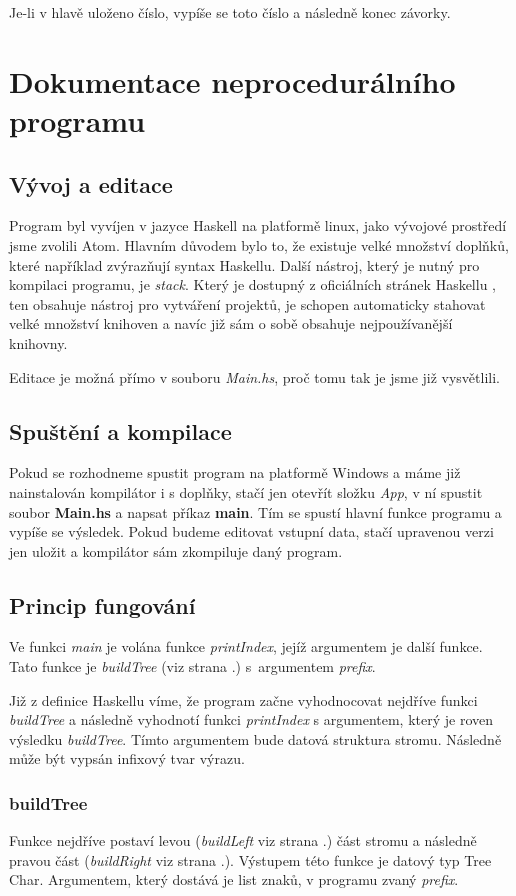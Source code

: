 \documentclass[12pt,a4paper]{report}
\begin{document}
Je-li v hlavě uloženo číslo, vypíše se toto číslo a následně konec závorky.
\newpage
\section{Dokumentace neprocedurálního programu}
\subsection{Vývoj a editace}
Program byl vyvíjen v jazyce Haskell na platformě linux, jako vývojové prostředí jsme zvolili Atom. Hlavním důvodem bylo to, že existuje velké množství doplňků, které například zvýrazňují syntax Haskellu. Další nástroj, který je nutný pro kompilaci programu, je \textit{stack}. Který je dostupný z oficiálních stránek Haskellu \cite{stack}, ten obsahuje nástroj pro vytváření projektů, je schopen automaticky stahovat velké množství knihoven a navíc již sám o sobě obsahuje nejpoužívanější knihovny.
 
Editace je možná přímo v souboru \textit{Main.hs}, proč tomu tak je jsme již vysvětlili.  

\subsection{Spuštění a kompilace}
Pokud se rozhodneme spustit program na platformě Windows a máme již nainstalován kompilátor i s doplňky, stačí jen otevřít složku \textit{App}, v ní spustit soubor \textbf{Main.hs} a napsat příkaz \textbf{main}. Tím se spustí hlavní funkce programu a vypíše se výsledek. Pokud budeme editovat vstupní data, stačí upravenou verzi jen uložit a kompilátor sám zkompiluje daný program. 
 
\subsection{Princip fungování}
Ve funkci \textit{main} je volána funkce \textit{printIndex}, jejíž argumentem je další funkce. Tato funkce je \textit{buildTree} (viz strana \pageref{buildTree}.) s~argumentem \textit{prefix}.

Již z definice Haskellu víme, že program začne vyhodnocovat nejdříve funkci \textit{buildTree} a následně vyhodnotí funkci \textit{printIndex} s argumentem, který je roven výsledku \textit{buildTree}. Tímto argumentem bude datová struktura stromu. Následně může být vypsán infixový tvar výrazu.  

\subsubsection{buildTree} \label{buildTree}
Funkce nejdříve postaví levou (\textit{buildLeft} viz strana \pageref{buildLeft}.) část stromu a následně pravou část  (\textit{buildRight} viz strana \pageref{buildRight}.). Výstupem této funkce je datový typ Tree Char. Argumentem, který dostává je list znaků, v programu zvaný \textit{prefix}.
\end{document}
